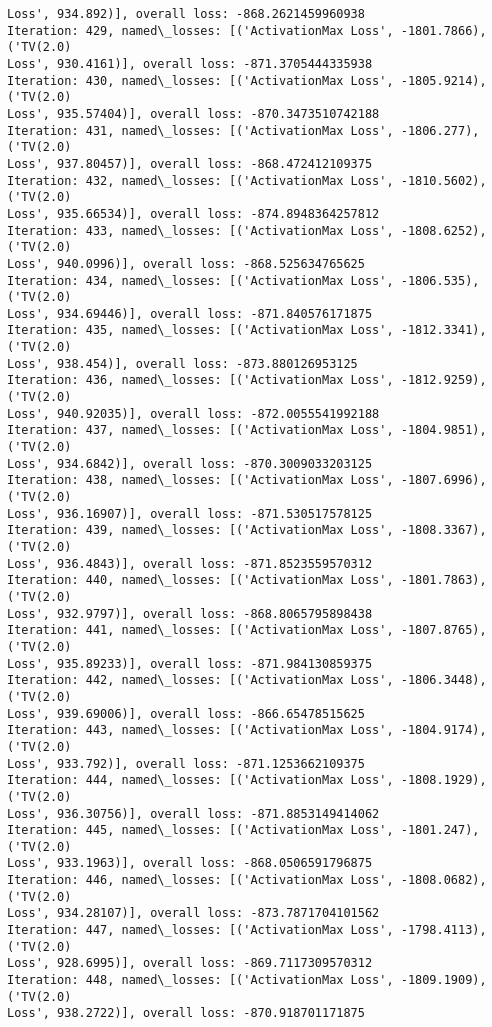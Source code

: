 \documentclass[10pt]{article}
\begin{document}
\begin{Verbatim}[commandchars=\\\{\}]
Loss', 934.892)], overall loss: -868.2621459960938
Iteration: 429, named\_losses: [('ActivationMax Loss', -1801.7866), ('TV(2.0)
Loss', 930.4161)], overall loss: -871.3705444335938
Iteration: 430, named\_losses: [('ActivationMax Loss', -1805.9214), ('TV(2.0)
Loss', 935.57404)], overall loss: -870.3473510742188
Iteration: 431, named\_losses: [('ActivationMax Loss', -1806.277), ('TV(2.0)
Loss', 937.80457)], overall loss: -868.472412109375
Iteration: 432, named\_losses: [('ActivationMax Loss', -1810.5602), ('TV(2.0)
Loss', 935.66534)], overall loss: -874.8948364257812
Iteration: 433, named\_losses: [('ActivationMax Loss', -1808.6252), ('TV(2.0)
Loss', 940.0996)], overall loss: -868.525634765625
Iteration: 434, named\_losses: [('ActivationMax Loss', -1806.535), ('TV(2.0)
Loss', 934.69446)], overall loss: -871.840576171875
Iteration: 435, named\_losses: [('ActivationMax Loss', -1812.3341), ('TV(2.0)
Loss', 938.454)], overall loss: -873.880126953125
Iteration: 436, named\_losses: [('ActivationMax Loss', -1812.9259), ('TV(2.0)
Loss', 940.92035)], overall loss: -872.0055541992188
Iteration: 437, named\_losses: [('ActivationMax Loss', -1804.9851), ('TV(2.0)
Loss', 934.6842)], overall loss: -870.3009033203125
Iteration: 438, named\_losses: [('ActivationMax Loss', -1807.6996), ('TV(2.0)
Loss', 936.16907)], overall loss: -871.530517578125
Iteration: 439, named\_losses: [('ActivationMax Loss', -1808.3367), ('TV(2.0)
Loss', 936.4843)], overall loss: -871.8523559570312
Iteration: 440, named\_losses: [('ActivationMax Loss', -1801.7863), ('TV(2.0)
Loss', 932.9797)], overall loss: -868.8065795898438
Iteration: 441, named\_losses: [('ActivationMax Loss', -1807.8765), ('TV(2.0)
Loss', 935.89233)], overall loss: -871.984130859375
Iteration: 442, named\_losses: [('ActivationMax Loss', -1806.3448), ('TV(2.0)
Loss', 939.69006)], overall loss: -866.65478515625
Iteration: 443, named\_losses: [('ActivationMax Loss', -1804.9174), ('TV(2.0)
Loss', 933.792)], overall loss: -871.1253662109375
Iteration: 444, named\_losses: [('ActivationMax Loss', -1808.1929), ('TV(2.0)
Loss', 936.30756)], overall loss: -871.8853149414062
Iteration: 445, named\_losses: [('ActivationMax Loss', -1801.247), ('TV(2.0)
Loss', 933.1963)], overall loss: -868.0506591796875
Iteration: 446, named\_losses: [('ActivationMax Loss', -1808.0682), ('TV(2.0)
Loss', 934.28107)], overall loss: -873.7871704101562
Iteration: 447, named\_losses: [('ActivationMax Loss', -1798.4113), ('TV(2.0)
Loss', 928.6995)], overall loss: -869.7117309570312
Iteration: 448, named\_losses: [('ActivationMax Loss', -1809.1909), ('TV(2.0)
Loss', 938.2722)], overall loss: -870.918701171875

\end{Verbatim}
\end{document}
